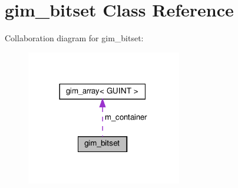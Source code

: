 \hypertarget{classgim__bitset}{}\section{gim\+\_\+bitset Class Reference}
\label{classgim__bitset}


Collaboration diagram for gim\+\_\+bitset\+:
\nopagebreak
\begin{figure}[H]
\begin{center}
\leavevmode
\includegraphics[width=192pt]{classgim__bitset__coll__graph}
\end{center}
\end{figure}
